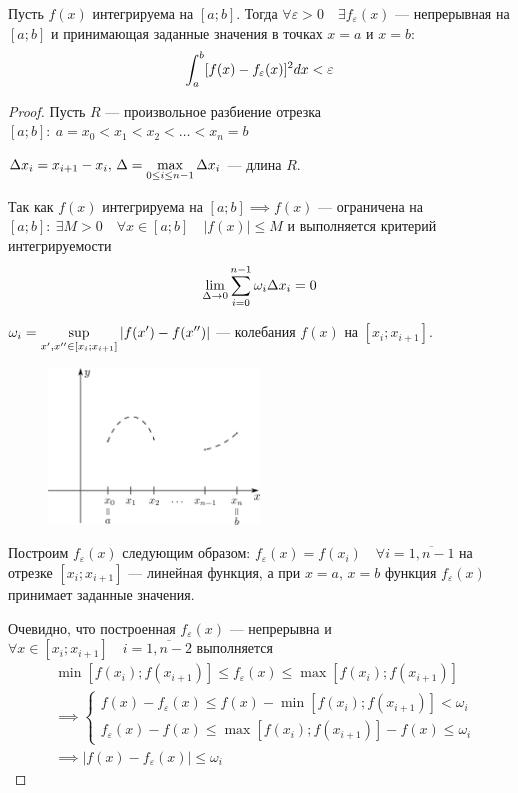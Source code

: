 \begin{theorem}
    Пусть $f(x)$ интегрируема на $[a; b]$. Тогда $\forall \varepsilon > 0 \quad
    \exists f_\varepsilon(x)$ --- непрерывная на $[a; b]$ и принимающая 
    заданные значения в точках $x = a$ и $x = b$:
    \[ \displaystyle\int_a^b [f(x) - f_\varepsilon(x)]^2 dx < \varepsilon \]
\end{theorem}
\begin{proof}
    Пусть $R$ --- произвольное разбиение отрезка $[a; b]: \:
    a = x_0 < x_1 < x_2 < \dots < x_n = b$

    $\Delta x_i = x_{i + 1} - x_i, \, \Delta = \displaystyle\max_{0 \leq i \leq n - 1}
    \Delta x_i$ --- длина $R$.

    Так как $f(x)$ интегрируема на $[a; b] \implies f(x)$ --- ограничена на
    $[a; b]: \: \exists M > 0 \quad \forall x \in [a; b] \quad |f(x)| \leq M$
    и выполняется критерий интегрируемости 
    \[ \displaystyle\lim_{\Delta \to 0} \displaystyle\sum_{i = 0}^{n - 1} \omega_i \Delta x_i = 0 \]

    $\omega_i = \displaystyle\sup_{x', x'' \in [x_i; x_{i + 1}]} |f(x') - f(x'')|$ ---
    колебания $f(x)$ на $[x_i; x_{i + 1}]$.

    \begin{figure}[H]
        \centering
        \includegraphics[width=0.5\textwidth]{images/approx_mean.png}
    \end{figure}

    Построим $f_\varepsilon(x)$ следующим образом: $f_\varepsilon(x) = f(x_i)
    \quad \forall i = \overline{1, n - 1}$ на отрезке $[x_i; x_{i + 1}]$ ---
    линейная функция, а при $x = a, \, x = b$ функция $f_\varepsilon(x)$
    принимает заданные значения.

    Очевидно, что построенная $f_\varepsilon(x)$ --- непрерывна и
    $\forall x \in [x_i; x_{i + 1}] \quad i = \overline{1, n - 2}$ выполняется
    \begin{align*}
        &\min [f(x_i); f(x_{i + 1})] \leq 
        f_\varepsilon(x) \leq \max [f(x_i); f(x_{i + 1})] \\
        &\implies \begin{cases}
            f(x) - f_\varepsilon(x) \leq f(x) - \min [f(x_i); f(x_{i + 1})] < \omega_i \\
            f_\varepsilon(x) - f(x) \leq \max [f(x_i); f(x_{i + 1})] - f(x) \leq \omega_i
        \end{cases} \\
        &\implies |f(x) - f_\varepsilon(x)| \leq \omega_i
    \end{align*} 


\end{proof}
